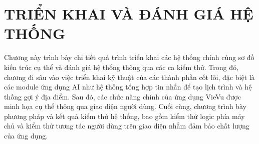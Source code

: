 \chapter{TRIỂN KHAI VÀ ĐÁNH GIÁ HỆ THỐNG}
Chương này trình bày chi tiết quá trình triển khai các hệ thống chính cùng sơ đồ kiến trúc cụ thể và đánh giá hệ thống thông qua các ca kiểm thử. Trong đó, chương đi sâu vào việc triển khai kỹ thuật của các thành phần cốt lõi, đặc biệt là các module ứng dụng AI như hệ thống tổng hợp tin nhắn để tạo lịch trình và hệ thống gợi ý địa điểm. Sau đó, các chức năng chính của ứng dụng VieVu được minh họa cụ thể thông qua giao diện người dùng. Cuối cùng, chương trình bày phương pháp và kết quả kiểm thử hệ thống, bao gồm kiểm thử logic phía máy chủ và kiểm thử tương tác người dùng trên giao diện nhằm đảm bảo chất lượng của ứng dụng.






